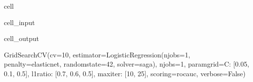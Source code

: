 \documentclass[letterpaper,10pt,english]{jupyterBook}
\begin{document}
\begin{sphinxuseclass}{cell}
\begin{sphinxVerbatimInput}
\begin{sphinxuseclass}{cell_input}
\end{sphinxuseclass}\end{sphinxVerbatimInput}
\begin{sphinxVerbatimOutput}

\begin{sphinxuseclass}{cell_output}
\begin{sphinxVerbatim}[commandchars=\\\{\}]
GridSearchCV(cv=10,
             estimator=LogisticRegression(n\PYGZus{}jobs=\PYGZhy{}1, penalty=\PYGZsq{}elasticnet\PYGZsq{},
                                          random\PYGZus{}state=42, solver=\PYGZsq{}saga\PYGZsq{}),
             n\PYGZus{}jobs=\PYGZhy{}1,
             param\PYGZus{}grid=\PYGZob{}\PYGZsq{}C\PYGZsq{}: [0.05, 0.1, 0.5], \PYGZsq{}l1\PYGZus{}ratio\PYGZsq{}: [0.7, 0.6, 0.5],
                         \PYGZsq{}max\PYGZus{}iter\PYGZsq{}: [10, 25]\PYGZcb{},
             scoring=\PYGZsq{}roc\PYGZus{}auc\PYGZsq{}, verbose=False)
\end{sphinxVerbatim}

\end{sphinxuseclass}\end{sphinxVerbatimOutput}

\end{sphinxuseclass}
\end{document}
